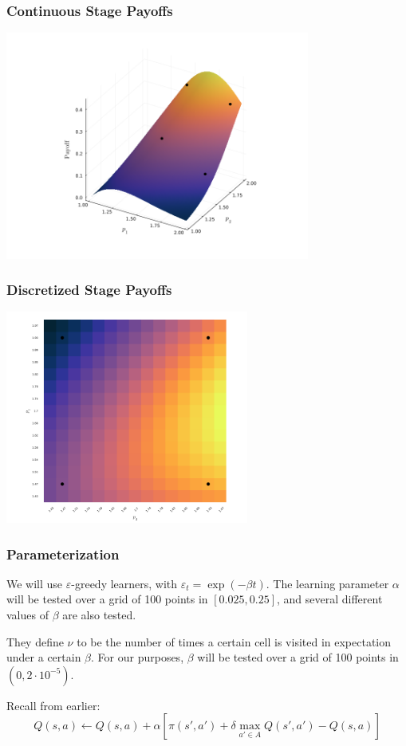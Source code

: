\documentclass{beamer}
\begin{document}
\begin{frame}\frametitle{Continuous Stage Payoffs}
\centering
	\includegraphics[width=10cm]{cont_plot.png}
\end{frame}
\begin{frame}\frametitle{Discretized Stage Payoffs}
\centering
	\includegraphics[width=8cm]{heatmap_plot.png}
\end{frame}

\begin{frame}\frametitle{Parameterization}
	We will use $\varepsilon$-greedy learners, with $\varepsilon_t = \exp(-\beta t)$. The learning parameter $\alpha$ will be tested over a grid of 100 points in $[0.025, 0.25]$, and several different values of $\beta$ are also tested. 
	
	They define $\nu$ to be the number of times a certain cell is visited in expectation under a certain $\beta$. For our purposes, $\beta$ will be tested over a grid of 100 points in $(0,2 \cdot 10^{-5})$. 
	
	Recall from earlier:\[Q(s,a) \leftarrow Q(s,a) + \alpha \left[ \pi(s',a') + \delta \max_{a'\in A} Q(s',a') - Q(s,a)\right]\]
\end{frame}
\end{document}
